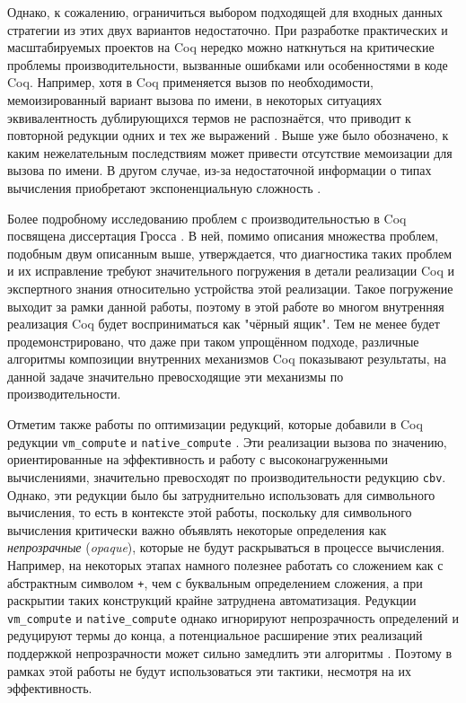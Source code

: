 \documentclass[../thesis.tex]{subfiles}
\begin{document}
Однако, к сожалению, ограничиться выбором подходящей для входных данных стратегии из этих двух вариантов недостаточно. При разработке практических и масштабируемых проектов на Coq нередко можно наткнуться на критические проблемы производительности, вызванные ошибками или особенностями в коде Coq. Например, хотя в Coq применяется вызов по необходимости, мемоизированный вариант вызова по имени, в некоторых ситуациях эквивалентность дублирующихся термов не распознаётся, что приводит к повторной редукции одних и тех же выражений \cite{sharing_bug}. Выше уже было обозначено, к каким нежелательным последствиям может привести отсутствие мемоизации для вызова по имени. В другом случае, из-за недостаточной информации о типах вычисления приобретают экспоненциальную сложность \cite{letform_bug}.

Более подробному исследованию проблем с производительностью в Coq посвящена диссертация Гросса \cite{gross_phd}. В ней, помимо описания множества проблем, подобным двум описанным выше, утверждается, что диагностика таких проблем и их исправление требуют значительного погружения в детали реализации Coq и экспертного знания относительно устройства этой реализации. Такое погружение выходит за рамки данной работы, поэтому в этой работе во многом внутренняя реализация Coq будет восприниматься как "чёрный ящик". Тем не менее будет продемонстрировано, что даже при таком упрощённом подходе, различные алгоритмы композиции внутренних механизмов Coq показывают результаты, на данной задаче значительно превосходящие эти механизмы по производительности.

Отметим также работы по оптимизации редукций, которые добавили в Coq редукции \texttt{vm\_compute} \cite{vm} и \texttt{native\_compute} \cite{native}. Эти реализации вызова по значению, ориентированные на эффективность и работу с высоконагруженными вычислениями, значительно превосходят по производительности редукцию \texttt{cbv}. Однако, эти редукции было бы затруднительно использовать для символьного вычисления, то есть в контексте этой работы, поскольку для символьного вычисления критически важно объявлять некоторые определения как \textit{непрозрачные} (\textit{opaque}), которые не будут раскрываться в процессе вычисления. Например, на некоторых этапах намного полезнее работать со сложением как с абстрактным символом \texttt{+}, чем с буквальным определением сложения, а при раскрытии таких конструкций крайне затруднена автоматизация. Редукции \texttt{vm\_compute} и \texttt{native\_compute} однако игнорируют непрозрачность определений и редуцируют термы до конца, а потенциальное расширение этих реализаций поддержкой непрозрачности может сильно замедлить эти алгоритмы \cite{opaque}. Поэтому в рамках этой работы не будут использоваться эти тактики, несмотря на их эффективность.
\end{document}
